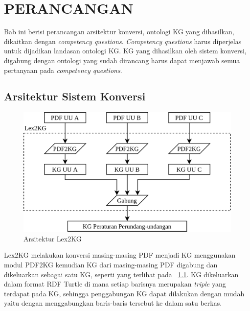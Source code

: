 \chapter{PERANCANGAN}
\label{chap:3}

Bab ini berisi perancangan arsitektur konversi, ontologi KG yang dihasilkan, dikaitkan dengan
\textit{competency questions}. \textit{Competency questions} harus diperjelas untuk dijadikan
landasan ontologi KG. KG yang dihasilkan oleh sistem konversi, digabung dengan ontologi yang sudah
dirancang harus dapat menjawab semua pertanyaan pada \textit{competency questions}.

\section{Arsitektur Sistem Konversi}
\label{sec:arsitektur-sistem-konversi}

\begin{figure}
  \centering
  \includegraphics[scale=0.35]{pictures/lex2kg.png}
  \caption{Arsitektur Lex2KG}
  \label{fig:lex2kg}
\end{figure}

Lex2KG melakukan konversi masing-masing PDF \legal menjadi KG menggunakan modul PDF2KG kemudian KG
dari masing-masing PDF digabung dan dikeluarkan sebagai satu KG, seperti yang terlihat pada
\pic~\ref{fig:lex2kg}. KG dikeluarkan dalam format RDF Turtle di mana setiap barisnya merupakan
\textit{triple} yang terdapat pada KG, sehingga penggabungan KG dapat dilakukan dengan mudah yaitu
dengan menggabungkan baris-baris tersebut ke dalam satu berkas. 

